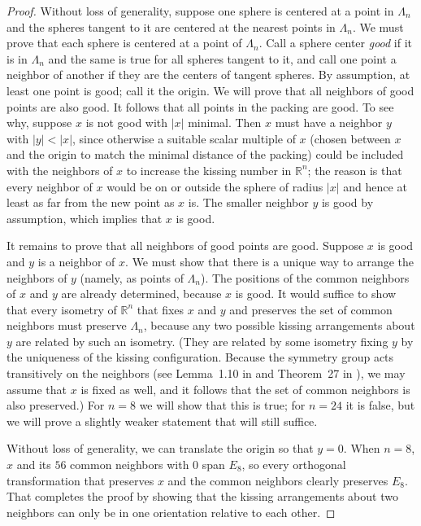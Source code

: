 \documentclass{jams-l}
\theoremstyle{plain}
\numberwithin{theorem}{section}
\theoremstyle{definition}
\numberwithin{equation}{section}
\newcommand{\R}{{\mathbb R}}
\begin{document}
\begin{proof}
Without loss of generality, suppose one sphere is centered at a
point in $\Lambda_n$ and the spheres tangent to it are centered
at the nearest points in $\Lambda_n$. We must prove that each
sphere is centered at a point of $\Lambda_n$. Call a sphere center
\textit{good\/} if it is in $\Lambda_n$ and the same is true for
all spheres tangent to it, and call one point a neighbor of
another if they are the centers of tangent spheres. By assumption,
at least one point is good; call it the origin.  We will prove
that all neighbors of good points are also good.  It follows that
all points in the packing are good.  To see why, suppose $x$ is
not good with $|x|$ minimal.  Then $x$ must have a neighbor $y$
with $|y| < |x|$, since otherwise a suitable scalar multiple of
$x$ (chosen between $x$ and the origin to match the minimal
distance of the packing) could be included with the neighbors of
$x$ to increase the kissing number in $\R^n$; the reason is that
every neighbor of $x$ would be on or outside the sphere of radius
$|x|$ and hence at least as far from the new point as $x$ is. The
smaller neighbor $y$ is good by assumption, which implies that $x$
is good.

It remains to prove that all neighbors of good points are good.
Suppose $x$ is good and $y$ is a neighbor of $x$.  We must show
that there is a unique way to arrange the neighbors of $y$
(namely, as points of $\Lambda_n$).  The positions of the common
neighbors of $x$ and $y$ are already determined, because $x$ is
good.  It would suffice to show that every isometry of $\R^n$ that
fixes $x$ and $y$ and preserves the set of common neighbors must
preserve $\Lambda_n$, because any two possible kissing
arrangements about $y$ are related by such an isometry.  (They are
related by some isometry fixing $y$ by the uniqueness of the
kissing configuration.  Because the symmetry group acts
transitively on the neighbors (see Lemma~1.10 in \cite[p.~25]{Eb}
and Theorem~27 in \cite[p.~288]{CS}), we may assume that $x$ is
fixed as well, and it follows that the set of common neighbors is
also preserved.) For $n=8$ we will show that this is true; for
$n=24$ it is false, but we will prove a slightly weaker statement
that will still suffice.

Without loss of generality, we can translate the origin so that
$y=0$. When $n=8$, $x$ and its $56$ common neighbors with $0$ span
$E_8$, so every orthogonal transformation that preserves $x$ and
the common neighbors clearly preserves $E_8$.  That completes the
proof by showing that the kissing arrangements about two neighbors
can only be in one orientation relative to each other.


\end{proof}
\end{document}
